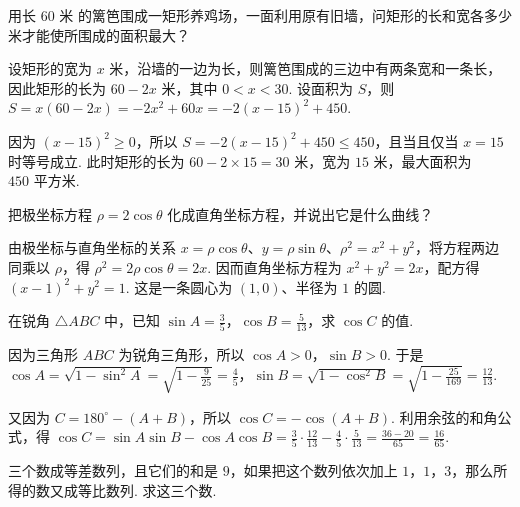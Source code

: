 \begin{problem}
用长 \( 60\text{ 米} \) 的篱笆围成一矩形养鸡场，一面利用原有旧墙，问矩形的长和宽各多少米才能使所围成的面积最大？
\end{problem}

\begin{solution}
设矩形的宽为 \(x\text{ 米}\)，沿墙的一边为长，则篱笆围成的三边中有两条宽和一条长，因此矩形的长为 \(60-2x\text{ 米}\)，其中 \(0<x<30\). 设面积为 \(S\)，则 \(S=x(60-2x)=-2x^2+60x=-2(x-15)^2+450\).

因为 \((x-15)^2\geqslant0\)，所以 \(S=-2(x-15)^2+450\leqslant450\)，且当且仅当 \(x=15\) 时等号成立. 此时矩形的长为 \(60-2\times15=30\text{ 米}\)，宽为 \(15\text{ 米}\)，最大面积为 \(450\text{ 平方米}\).
\end{solution}

\begin{problem}
把极坐标方程 \(\rho=2\cos\theta\) 化成直角坐标方程，并说出它是什么曲线？
\end{problem}

\begin{solution}
由极坐标与直角坐标的关系 \(x=\rho\cos\theta\)、\(y=\rho\sin\theta\)、\(\rho^2=x^2+y^2\)，将方程两边同乘以 \(\rho\)，得 \(\rho^2=2\rho\cos\theta=2x\). 因而直角坐标方程为 \(x^2+y^2=2x\)，配方得 \((x-1)^2+y^2=1\). 这是一条圆心为 \((1,0)\)、半径为 \(1\) 的圆.
\end{solution}

\begin{problem}
在锐角 \( \triangle ABC \) 中，已知 \( \sin A=\frac{3}{5} \)，\( \cos B=\frac{5}{13} \)，求 \( \cos C \) 的值.
\end{problem}

\begin{solution}
因为三角形 \(ABC\) 为锐角三角形，所以 \(\cos A>0\)，\(\sin B>0\). 于是 \(\cos A=\sqrt{1-\sin^2A}=\sqrt{1-\frac{9}{25}}=\frac45\)，\(\sin B=\sqrt{1-\cos^2B}=\sqrt{1-\frac{25}{169}}=\frac{12}{13}\).

又因为 \(C=180^\circ-(A+B)\)，所以 \(\cos C=-\cos(A+B)\). 利用余弦的和角公式，得 \(\cos C=\sin A\sin B-\cos A\cos B=\frac35\cdot\frac{12}{13}-\frac45\cdot\frac5{13}=\frac{36-20}{65}=\frac{16}{65}\).
\end{solution}

\begin{problem}
三个数成等差数列，且它们的和是 \( 9 \)，如果把这个数列依次加上 \( 1 \)，\( 1 \)，\( 3 \)，那么所得的数又成等比数列. 求这三个数.
\end{problem}

